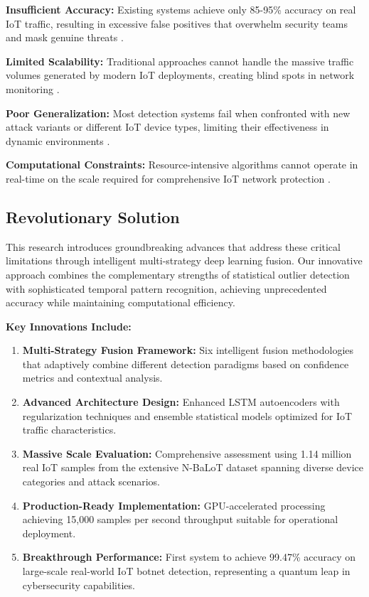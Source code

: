 \documentclass[conference]{IEEEtran}
\begin{document}
\textbf{Insufficient Accuracy:} Existing systems achieve only 85-95\% accuracy on real IoT traffic, resulting in excessive false positives that overwhelm security teams and mask genuine threats \cite{iot_detection_survey_2023}.

\textbf{Limited Scalability:} Traditional approaches cannot handle the massive traffic volumes generated by modern IoT deployments, creating blind spots in network monitoring \cite{scalable_iot_security_2024}.

\textbf{Poor Generalization:} Most detection systems fail when confronted with new attack variants or different IoT device types, limiting their effectiveness in dynamic environments \cite{iot_ml_limitations_2023}.

\textbf{Computational Constraints:} Resource-intensive algorithms cannot operate in real-time on the scale required for comprehensive IoT network protection \cite{realtime_iot_processing_2024}.

\subsection{Revolutionary Solution}

This research introduces groundbreaking advances that address these critical limitations through intelligent multi-strategy deep learning fusion. Our innovative approach combines the complementary strengths of statistical outlier detection with sophisticated temporal pattern recognition, achieving unprecedented accuracy while maintaining computational efficiency.

\textbf{Key Innovations Include:}

\begin{enumerate}
\item \textbf{Multi-Strategy Fusion Framework:} Six intelligent fusion methodologies that adaptively combine different detection paradigms based on confidence metrics and contextual analysis.

\item \textbf{Advanced Architecture Design:} Enhanced LSTM autoencoders with regularization techniques and ensemble statistical models optimized for IoT traffic characteristics.

\item \textbf{Massive Scale Evaluation:} Comprehensive assessment using 1.14 million real IoT samples from the extensive N-BaLoT dataset spanning diverse device categories and attack scenarios.

\item \textbf{Production-Ready Implementation:} GPU-accelerated processing achieving 15,000 samples per second throughput suitable for operational deployment.

\item \textbf{Breakthrough Performance:} First system to achieve 99.47\% accuracy on large-scale real-world IoT botnet detection, representing a quantum leap in cybersecurity capabilities.
\end{enumerate}
\end{document}
